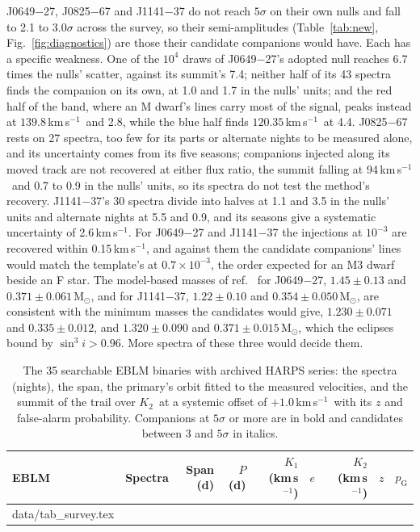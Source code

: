 \documentclass[3p,11pt]{elsarticle}
\makeatletter
\newcommand{\tabinput}[1]{\@@input #1 }
\newcommand{\kms}{km\,s$^{-1}$}
\newcommand{\Msun}{M$_\odot$}
\newcommand{\Kone}{$K_1$}
\newcommand{\Ktwo}{$K_2$}
\makeatother
\begin{document}
J0649$-$27, J0825$-$67 and J1141$-$37 do not reach $5\sigma$ on their own nulls and fall to 2.1 to
$3.0\sigma$ across the survey, so their semi-amplitudes (Table~\ref{tab:new},
Fig.~\ref{fig:diagnostics}) are those their candidate companions would have. Each has a specific
weakness. One of the $10^4$ draws of J0649$-$27's adopted null reaches 6.7 times the nulls'
scatter, against its summit's 7.4; neither half of its 43 spectra finds the companion on its own, at 1.0 and
1.7 in the nulls' units; and the red half of the band, where an M dwarf's lines carry most of the
signal, peaks instead at $139.8$\,\kms\ and 2.8, while the blue half finds $120.35$\,\kms\ at 4.4.
J0825$-$67 rests on 27 spectra, too few for its parts or alternate nights to be measured alone, and
its uncertainty comes from its five seasons; companions injected along its moved track are not
recovered at either flux ratio, the summit falling at 94\,\kms\ and 0.7 to 0.9 in the nulls' units,
so its spectra do not test the method's recovery. J1141$-$37's 30 spectra divide into halves at 1.1
and 3.5 in the nulls' units and alternate nights at 5.5 and 0.9, and its seasons give a systematic
uncertainty of 2.6\,\kms. For J0649$-$27 and J1141$-$37 the injections at $10^{-3}$ are recovered
within 0.15\,\kms, and against them the candidate companions' lines would match the template's at
$0.7\times10^{-3}$, the order expected for an M3 dwarf beside an F star. The model-based masses of
ref.~\cite{Triaud2017} for J0649$-$27, $1.45 \pm 0.13$ and $0.371 \pm 0.061$\,\Msun, and for
J1141$-$37, $1.22 \pm 0.10$ and $0.354 \pm 0.050$\,\Msun, are consistent with the minimum masses
the candidates would give, $1.230 \pm 0.071$ and $0.335 \pm 0.012$, and $1.320 \pm 0.090$ and
$0.371 \pm 0.015$\,\Msun, which the eclipses bound by $\sin^3 i > 0.96$. More spectra of these
three would decide them.

\begin{table}[!htbp]
\centering
\caption{The 35 searchable EBLM binaries with archived HARPS series: the spectra (nights), the
span, the primary's orbit fitted to the measured velocities, and the summit of the trail over \Ktwo\
at a systemic offset of $+1.0$\,\kms\ with its $z$ and false-alarm probability. Companions at
$5\sigma$ or more are in bold and candidates between 3 and $5\sigma$ in italics.}\label{tab:survey}
\small
\begin{tabular}{lrrrrrrrr}
\toprule
EBLM & Spectra & Span (d) & $P$ (d) & \Kone\ (\kms) & $e$ & \Ktwo\ (\kms) & $z$ & $p_\mathrm{G}$\\
\midrule
\tabinput{data/tab_survey.tex}
\bottomrule
\end{tabular}
\end{table}
\end{document}
